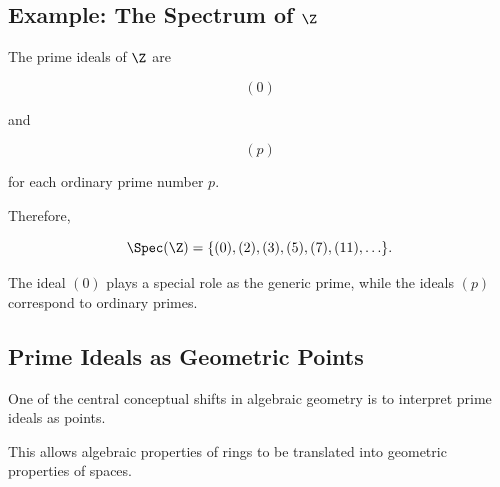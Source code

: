 \subsection{Example: The Spectrum of \(\Z\)}
\label{subsec:spectrum-z}

The prime ideals of \(\Z\) are

\[ (0) \]

and

\[ (p) \]

for each ordinary prime number \(p\).

Therefore,

\[ \Spec(\Z)=\{(0),(2),(3),(5),(7),(11),\ldots\}. \]

The ideal \((0)\) plays a special role as the generic prime, while the ideals
\((p)\) correspond to ordinary primes.

\subsection{Prime Ideals as Geometric Points}
\label{subsec:prime-ideals-geometric-points}

One of the central conceptual shifts in algebraic geometry is to interpret
prime ideals as points.

\begin{center}
\end{center}

This allows algebraic properties of rings to be translated into geometric
properties of spaces.

